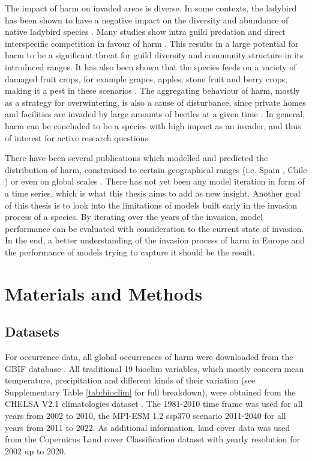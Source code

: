 \documentclass[12pt,a4paper]{article}
\begin{document}
The impact of \gls{harm} on invaded areas is diverse.
In some contexts, the ladybird has been shown to have a negative impact on the diversity and abundance of native ladybird species \autocite{roy2016harmonia}.
Many studies show intra guild predation and direct interspecific competition in favour of \gls{harm} \autocite{pell2008harmoniaIGP}.
This results in a large potential for \gls{harm} to be a significant threat for guild diversity and community structure in its introduced ranges.
It has also been shown that the species feeds on a variety of damaged fruit crops, for example grapes, apples, stone fruit and berry crops, making it a pest in these scenarios \autocite{koch2004harmoniafoodcrop}.
The aggregating behaviour of \gls{harm}, mostly as a strategy for overwintering, is also a cause of disturbance, since private homes and facilities are invaded by large amounts of beetles at a given time \autocite{nalepa2005harmoniahomes}.
In general, \gls{harm} can be concluded to be a species with high impact as an invader, and thus of interest for active research questions.

There have been several publications which modelled and predicted the distribution of \gls{harm}, constrained to certain geographical ranges (i.e. Spain \autocite{ameixa2019harmSDMSpain}, Chile \autocite{alaniz2018harmSDMChile}) or even on global scales \autocite{bidinger2012harmSDMglobalMaxent, poutsma2008harmSDMglobalClimex}.
There has not yet been any model iteration in form of a time series, which is what this thesis aims to add as new insight.
Another goal of this thesis is to look into the limitations of models built early in the invasion process of a species.
By iterating over the years of the invasion, model performance can be evaluated with consideration to the current state of invasion.
In the end, a better understanding of the invasion process of \gls{harm} in Europe and the performance of models trying to capture it should be the result.



\newpage
\section{Materials and Methods} \label{sec:materialsandmethods}

\subsection{Datasets} \label{ssec:datasets}
For occurrence data, all global occurrences of \gls{harm} were downloaded from the GBIF database \autocite{GBIFaxyridisdataset}.
All traditional 19 bioclim variables, which mostly concern mean temperature, precipitation and different kinds of their variation (see Supplementary Table \ref{tab:bioclim} for full breakdown), were obtained from the CHELSA V2.1 climatologies dataset \autocite{karger2017CHELSApaper, CHELSAbioclimdataset}.
The 1981-2010 time frame was used for all years from 2002 to 2010, the MPI-ESM 1.2 ssp370 scenario 2011-2040 for all years from 2011 to 2022.
As additional information, land cover data was used from the Copernicus Land cover Classification dataset \autocite{COPlandcoverdataset}  with yearly resolution for 2002 up to 2020.
\end{document}
